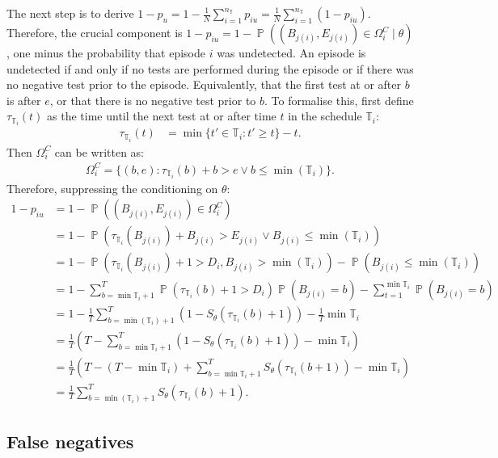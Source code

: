 \documentclass[12pt, letterpaper]{article} %
\DeclareMathOperator{\prob}{\mathbb{P}}
\newcommand{\ssep}{:}
\newcommand{\sched}{\mathbb{T}}
\newcommand{\nsched}{n_{\sched}}
\begin{document}
The next step is to derive $1 - p_u = 1 - \frac{1}{N} \sum_{i=1}^{\nsched} p_{iu} = \frac{1}{N} \sum_{i=1}^{\nsched} (1 - p_{iu})$.
Therefore, the crucial component is $1 - p_{iu} = 1 - \prob((B_{j(i)}, E_{j(i)}) \in \Omega^C_i \mid \theta)$, one minus the probability that episode $i$ was undetected.
An episode is undetected if and only if no tests are performed during the episode or if there was no negative test prior to the episode.
Equivalently, that the first test at or after $b$ is after $e$, or that there is no negative test prior to $b$.
To formalise this, first define $\tau_{\sched_i}(t)$ as the time until the next test at or after time $t$ in the schedule $\sched_i$:
\begin{align}
\tau_{\sched_i}(t) &= \min \{ t' \in \sched_i : t' \geq t \} - t.
\end{align}
Then $\Omega^C_i$ can be written as:
\begin{align}
\Omega_i^C = \{ (b, e) \ssep \tau_{\sched_i}(b) + b > e \vee b \leq \min(\sched_i) \}.
\end{align}
Therefore, suppressing the conditioning on $\theta$:
\begin{align}
1 - p_{iu}
&= 1 - \prob((B_{j(i)}, E_{j(i)}) \in \Omega^C_i) \\
&= 1 - \prob( \tau_{\sched_i}(B_{j(i)}) + B_{j(i)} > E_{j(i)} \vee B_{j(i)} \leq \min(\sched_i) ) \\
&= 1 - \prob( \tau_{\sched_i}(B_{j(i)}) + 1 > D_i , B_{j(i)} > \min(\sched_i) )  - \prob( B_{j(i)} \leq \min(\sched_i) ) \\
&= 1 - \sum_{b={\min\sched_i} + 1}^T \prob( \tau_{\sched_i}(b) + 1> D_i) \prob(B_{j(i)} = b) - \sum_{t=1}^{\min\sched_i} \prob(B_{j(i)} = b)\\
&= 1 - \frac{1}{T} \sum_{b=\min(\sched_i)+1}^T (1 - S_\theta(\tau_{\sched_i}(b) + 1)) - \frac{1}{T} \min\sched_i \\
&= \frac{1}{T} \left(T - \sum_{b=\min\sched_i+1}^T (1 - S_\theta(\tau_{\sched_i}(b) + 1)) - \min\sched_i \right) \\
&= \frac{1}{T} \left(T - (T - \min\sched_i) + \sum_{b=\min\sched_i+1}^T S_\theta(\tau_{\sched_i}(b + 1)) - \min\sched_i \right) \\
&= \frac{1}{T} \sum_{b=\min(\sched_i)+1}^T S_\theta(\tau_{\sched_i}(b) + 1). \label{perf-test:eq:piu}
\end{align}

\subsection{False negatives}
\end{document}
